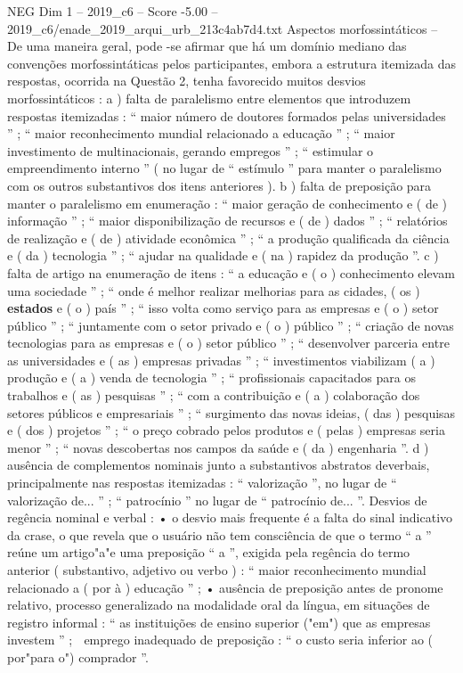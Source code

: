 \begin{textsample}{NEG Dim 1 – 2019\_c6 – Score -5.00 – 2019\_c6/enade\_2019\_arqui\_urb\_213c4ab7d4.txt}
Aspectos morfossintáticos – De uma maneira geral, pode -se afirmar que há um domínio mediano das convenções morfossintáticas pelos participantes, embora a estrutura itemizada das respostas, ocorrida na Questão 2, tenha favorecido muitos desvios morfossintáticos : a ) falta de paralelismo entre elementos que introduzem respostas itemizadas : “ maior número de doutores formados pelas universidades ” ; “ maior reconhecimento mundial relacionado a educação ” ; “ maior investimento de multinacionais, gerando empregos ” ; “ estimular o empreendimento interno ” ( no lugar de “ estímulo ” para manter o paralelismo com os outros substantivos dos itens anteriores ). b ) falta de preposição para manter o paralelismo em enumeração : “ maior geração de conhecimento e ( de ) informação ” ; “ maior disponibilização de recursos e ( de ) dados ” ; “ relatórios de realização e ( de ) atividade econômica ” ; “ a produção qualificada da ciência e ( da ) tecnologia ” ; “ ajudar na qualidade e ( na ) rapidez da produção ”. c ) falta de artigo na enumeração de itens : “ a educação e ( o ) conhecimento elevam uma sociedade ” ; “ onde é melhor realizar melhorias para as cidades, ( os ) \textbf{estados} e ( o ) país ” ; “ isso volta como serviço para as empresas e ( o ) setor público ” ; “ juntamente com o setor privado e ( o ) público ” ; “ criação de novas tecnologias para as empresas e ( o ) setor público ” ; “ desenvolver parceria entre as universidades e ( as ) empresas privadas ” ; “ investimentos viabilizam ( a ) produção e ( a ) venda de tecnologia ” ; “ profissionais capacitados para os trabalhos e ( as ) pesquisas ” ; “ com a contribuição e ( a ) colaboração dos setores públicos e empresariais ” ; “ surgimento das novas ideias, ( das ) pesquisas e ( dos ) projetos ” ; “ o preço cobrado pelos produtos e ( pelas ) empresas seria menor ” ; “ novas descobertas nos campos da saúde e ( da ) engenharia ”. d ) ausência de complementos nominais junto a substantivos abstratos deverbais, principalmente nas respostas itemizadas : “ valorização ”, no lugar de “ valorização de... ” ; “ patrocínio ” no lugar de “ patrocínio de... ”.
Desvios de regência nominal e verbal : • o desvio mais frequente é a falta do sinal indicativo da crase, o que revela que o usuário não tem consciência de que o termo “ a ” reúne um artigo"a"e uma preposição “ a ”, exigida pela regência do termo anterior ( substantivo, adjetivo ou verbo ) : “ maior reconhecimento mundial relacionado a ( por à ) educação ” ; • ausência de preposição antes de pronome relativo, processo generalizado na modalidade oral da língua, em situações de registro informal : “ as instituições de ensino superior ("em") que as empresas investem ” ;  emprego inadequado de preposição : “ o custo seria inferior ao ( por"para o") comprador ”.

\end{textsample}
